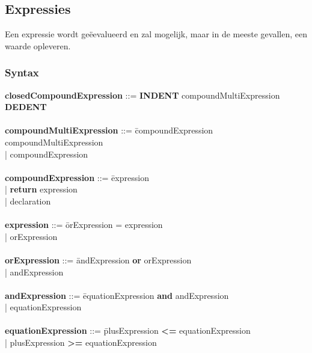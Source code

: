 \subsection{Expressies}
Een expressie wordt ge\"{e}evalueerd en zal mogelijk, maar in de meeste gevallen, een waarde opleveren.
    \subsubsection{Syntax}
        \begin{tabbing} 
            {\bf closedCompoundExpression}    ::= \textbf{INDENT} compoundMultiExpression \textbf{DEDENT}\\
            \\ 
            {\bf compoundMultiExpression}     ::= \=compoundExpression compoundMultiExpression\\
                                                  \>| compoundExpression\\
            \\
            {\bf compoundExpression}          ::= \=expression\\
                                                  \>| \textbf{return} expression\\
                                                  \>| declaration\\
            \\ 
            {\bf expression}                  ::= \=orExpression = expression\\
                                                  \>| orExpression\\
            \\   
            {\bf orExpression}                ::= \=andExpression \textbf{or} orExpression\\
                                                  \>| andExpression\\
            \\   
            {\bf andExpression}               ::= \=equationExpression \textbf{and} andExpression\\
                                                  \>| equationExpression\\
            \\ 
            {\bf equationExpression}          ::= \=plusExpression \textbf{\textless{}=} equationExpression\\
                                                  \>| plusExpression \textbf{\textgreater{}=} equationExpression\\

\end{tabbing}
